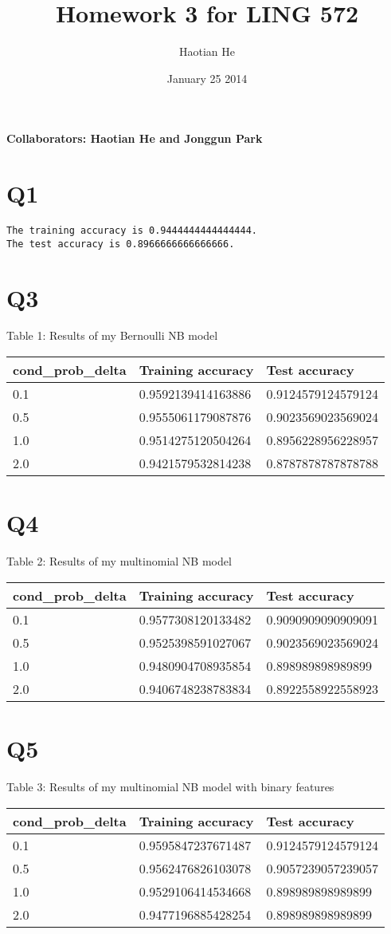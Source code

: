 \documentclass[11pt]{article}
\title{Homework 3 for LING 572}
\author{Haotian He}
\date{January 25 2014}
\begin{document}
\maketitle
\textbf{Collaborators: Haotian He and Jonggun Park}
\section{Q1}
\texttt{The training accuracy is 0.9444444444444444. \\ The test accuracy is 0.8966666666666666.}
\section{Q3}
Table 1:  Results of my Bernoulli NB model \\
\begin{tabular}{|l|l|l|}
    \hline
    cond\_prob\_delta & Training accuracy   & Test accuracy      \\ \hline
    0.1     & 0.9592139414163886 &  0.9124579124579124 \\ \hline
    0.5     & 0.9555061179087876  & 0.9023569023569024 \\ \hline
    1.0     & 0.9514275120504264  & 0.8956228956228957 \\ \hline
    2.0    &  0.9421579532814238 &   0.8787878787878788 \\
    \hline
\end{tabular}
\section{Q4}
Table 2: Results of my multinomial NB model \\
\begin{tabular}{|l|l|l|}
    \hline
    cond\_prob\_delta & Training accuracy   & Test accuracy      \\ \hline
    0.1     &  0.9577308120133482 & 0.9090909090909091  \\ \hline
    0.5     & 0.9525398591027067 &  0.9023569023569024 \\ \hline
    1.0     & 0.9480904708935854 & 0.898989898989899 \\ \hline
    2.0    & 0.9406748238783834 &  0.8922558922558923 \\
    \hline
\end{tabular}
\section{Q5}
Table 3: Results of my multinomial NB model with binary features \\
\begin{tabular}{|l|l|l|}
    \hline
    cond\_prob\_delta & Training accuracy   & Test accuracy      \\ \hline
    0.1     &  0.9595847237671487 & 0.9124579124579124  \\ \hline
    0.5     & 0.9562476826103078 &  0.9057239057239057 \\ \hline
    1.0     & 0.9529106414534668 &  0.898989898989899 \\ \hline
    2.0    & 0.9477196885428254 &  0.898989898989899 \\
    \hline
\end{tabular}
\end{document}
